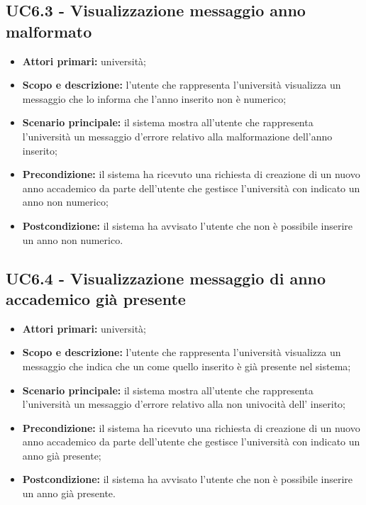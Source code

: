 \documentclass[AnalisiDeiRequisiti.tex]{subfiles}
\begin{document}
\subsection{UC6.3 - Visualizzazione messaggio anno malformato}
\begin{itemize}
	\item \textbf{Attori primari:} università;
	\item \textbf{Scopo e descrizione:} l'utente che rappresenta l'università visualizza un messaggio che lo informa che l'anno inserito non è numerico;
	\item \textbf{Scenario principale:} il sistema mostra all'utente che rappresenta l'università un messaggio d'errore relativo alla malformazione dell'anno inserito;
	\item \textbf{Precondizione:} il sistema ha ricevuto una richiesta di creazione di un nuovo anno accademico da parte dell'utente che gestisce l'università con indicato un anno non numerico; 
	\item \textbf{Postcondizione:} il sistema ha avvisato l'utente che non è possibile inserire un anno non numerico.
\end{itemize}
\subsection{UC6.4 - Visualizzazione messaggio di anno accademico già presente}
\begin{itemize}
	\item \textbf{Attori primari:} università;
	\item \textbf{Scopo e descrizione:} l'utente che rappresenta l'università visualizza un messaggio che indica che un  come quello inserito è già presente nel sistema;
	\item \textbf{Scenario principale:} il sistema mostra all'utente che rappresenta l'università un messaggio d'errore relativo alla non univocità dell' inserito;
	\item \textbf{Precondizione:} il sistema ha ricevuto una richiesta di creazione di un nuovo anno accademico da parte dell'utente che gestisce l'università con indicato un anno già presente;
	\item \textbf{Postcondizione:} il sistema ha avvisato l'utente che non è possibile inserire un anno già presente.
\end{itemize}
\end{document}

